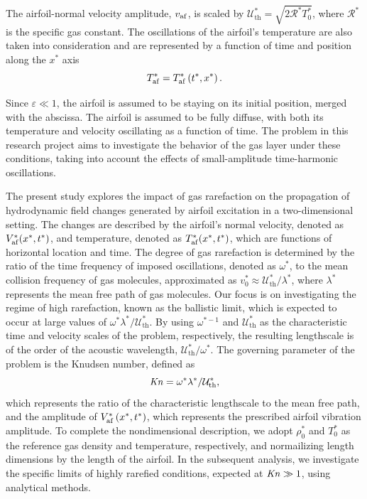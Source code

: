 The airfoil-normal velocity amplitude, $v_{\mathrm{af}}$, is scaled by $\mathcal{U}_{\mathrm{th}}^*=\sqrt{2\mathcal{R}^*T_0^*}$, where $\mathcal{R}^*$ is the specific gas constant. The oscillations of the airfoil's temperature are also taken into consideration and are represented by a function of time and position along the $x^*$ axis
\begin{equation} \label{eq:T_af}
    T_{\mathrm{af}}^*=T_{\mathrm{af}}^*\left(t^*,x^*\right)
    .
\end{equation}

Since $\varepsilon\ll 1$, the airfoil is assumed to be staying on its initial position, merged with the abscissa. The airfoil is assumed to be fully diffuse, with both its temperature and velocity oscillating as a function of time. The problem in this research project aims to investigate the behavior of the gas layer under these conditions, taking into account the effects of small-amplitude time-harmonic oscillations.

The present study explores the impact of gas rarefaction on the propagation of hydrodynamic field changes generated by airfoil excitation in a two-dimensional setting. The changes are described by the airfoil's normal velocity, denoted as $V_{\mathrm{af}}^*(x^*,t^*)$, and temperature, denoted as $T_{\mathrm{af}}^*(x^*,t^*)$, which are functions of horizontal location and time. The degree of gas rarefaction is determined by the ratio of the time frequency of imposed oscillations, denoted as $\omega^*$, to the mean collision frequency of gas molecules, approximated as $v_0^*\approx \mathcal{U}_{\mathrm{th}}^* / \lambda^*$, where $\lambda^*$ represents the mean free path of gas molecules. Our focus is on investigating the regime of high rarefaction, known as the ballistic limit, which is expected to occur at large values of $\omega^* \lambda^* / \mathcal{U}_{\mathrm{th}}^*$. By using $\omega^{*-1}$ and $\mathcal{U}_{\mathrm{th}}^*$ as the characteristic time and velocity scales of the problem, respectively, the resulting lengthscale is of the order of the acoustic wavelength, $\mathcal{U}_{\mathrm{th}}^* / \omega^*$. The governing parameter of the problem is the Knudsen number, defined as
\begin{equation} \label{eq:Knud}
 \operatorname{\mathit{K\kern-.11em n}}
 =
 \omega^* \lambda^* / \mathcal{U}_{\mathrm{th}}^*
 ,
\end{equation}
which represents the ratio of the characteristic lengthscale to the mean free path, and the amplitude of $V_{\mathrm{af}}^*\left(x^*,t^*\right)$, which represents the prescribed airfoil vibration amplitude. To complete the nondimensional description, we adopt $\rho_0^*$ and $T_0^*$ as the reference gas density and temperature, respectively, and normailizing length dimensions by the length of the airfoil. In the subsequent analysis, we investigate the specific limits of highly rarefied conditions, expected at $\operatorname{\mathit{K\kern-.11em n}} \gg 1$, using analytical methods.


